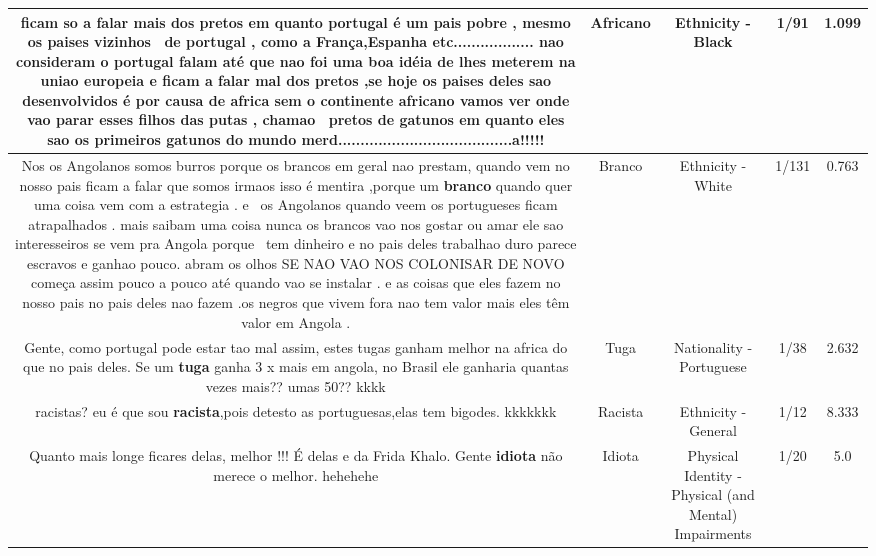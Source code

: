 \documentclass[11pt]{article}
\newlength\mylength
\begin{document}
\begin{center}
\begin{longtable}{|C{.65\mylength}|C{.30\mylength}|C{.12\mylength}|C{.12\mylength}|C{.12\mylength}|}
  \small ficam so a falar mais dos pretos em quanto portugal é um pais pobre , mesmo os paises vizinhos  de portugal , como a França,Espanha etc.................. nao consideram o portugal falam até que nao foi uma boa idéia de lhes meterem na uniao europeia e ficam a falar mal dos pretos ,se hoje os paises deles sao desenvolvidos é por causa de africa sem o continente \textbf{africano} vamos ver onde vao parar esses filhos das putas , chamao  pretos de gatunos em quanto eles sao os primeiros gatunos do mundo merd.......................................a!!!!!\normalsize   & Africano & Ethnicity - Black & 1/91 & 1.099 \\  \hline
  \small Nos os Angolanos somos burros porque os brancos em geral nao prestam, quando vem no nosso pais ficam a falar que somos irmaos isso é mentira ,porque um \textbf{branco} quando quer uma coisa vem com a estrategia . e  os Angolanos quando veem os portugueses ficam atrapalhados . mais saibam uma coisa nunca os brancos vao nos gostar ou amar ele sao interesseiros se vem pra Angola porque  tem dinheiro e no pais deles trabalhao duro parece escravos e ganhao pouco. abram os olhos SE NAO VAO NOS COLONISAR DE NOVO começa assim pouco a pouco até quando vao se instalar . e as coisas que eles fazem no nosso pais no pais deles nao fazem .os negros que vivem fora nao tem valor mais eles têm valor em Angola .\normalsize   & Branco & Ethnicity - White & 1/131 & 0.763 \\  \hline
  \small Gente, como portugal pode estar tao mal assim, estes tugas ganham melhor na africa do que no pais deles. Se um \textbf{tuga} ganha 3 x mais em angola, no Brasil ele ganharia quantas vezes mais?? umas 50?? kkkk\normalsize   & Tuga & Nationality - Portuguese & 1/38 & 2.632 \\  \hline
  \small racistas? eu é que sou \textbf{racista},pois detesto as portuguesas,elas tem bigodes. kkkkkkk\normalsize   & Racista & Ethnicity - General & 1/12 & 8.333 \\  \hline
  \small Quanto mais longe ficares delas, melhor !!! É delas e da Frida Khalo. Gente \textbf{idiota} não merece o melhor. hehehehe\normalsize   & Idiota & Physical Identity - Physical (and Mental) Impairments & 1/20 & 5.0 \\  \hline

\end{longtable}
\end{center}
\end{document}
